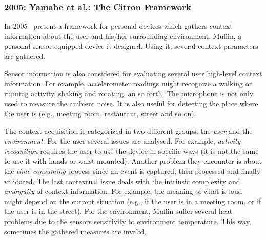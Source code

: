\subsubsection{2005: Yamabe et al.: The Citron Framework}
\label{sec:yamabe}

In 2005~\citet{yamabe_citron_2005} present a framework for personal devices 
which gathers context information about the user and his/her surrounding 
environment. Muffin, a personal sensor-equipped device is designed. Using it, 
several context parameters are gathered.

Sensor information is also considered for evaluating several user high-level 
context information. For example, accelerometer readings might recognize a 
walking or running activity, shaking and rotating, an so forth. The microphone 
is not only used to measure the ambient noise. It is also useful for detecting 
the place where the user is (e.g., meeting room, restaurant, street and so on).

The context acquisition is categorized in two different groups: the \textit{user}
and the \textit{environment}. For the user several issues are analysed. For 
example, \textit{activity recognition} requires the user to use the device in 
specific ways (it is not the same to use it with hands or waist-mounted). Another 
problem they encounter is about the \textit{time consuming} process since an 
event is captured, then processed and finally validated. The last contextual 
issue deals with the intrinsic complexity and \textit{ambiguity} of context 
information. For example, the meaning of what is loud might depend on the current 
situation (e.g., if the user is in a meeting room, or if the user is in the street). 
For the environment, Muffin suffer several heat problems due to the sensors 
sensitivity to environment temperature. This way, sometimes the gathered measures 
are invalid.

%  
% 
% 
